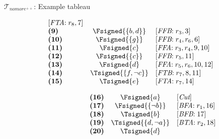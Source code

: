 \begin{frame}{$\mathcal{T}_{\textit{nomore}^{++}}$: Example tableau}
\begin{center}
\begin{minipage}[t]{16cm}
\begin{minipage}[t]{4.5cm}
\[\begin{array}{lcl}
  [\textit{FTA}{:}\;r_8, \text{7}]                 \\
\textbf{(9)}                                       &
  \Fsigned{\{b,d\}}                                &
  [\textit{FFB}{:}\;r_3, \text{3}]                 \\
\textbf{(10)}                                      &
  \Fsigned{\{g\}}                                  &
  [\textit{FFB}{:}\;r_4, r_6, \text{6}]            \\
\textbf{(11)}                                      &
  \Fsigned{c}                                      &
  [\textit{FFA}{:}\;r_3,r_4, \text{9}, \text{10}]  \\
\textbf{(12)}                                      &
  \Fsigned{\{c\}}                                  &
  [\textit{FFB}{:}\;r_5, \text{11}]                \\
\textbf{(13)}                                      &
  \Fsigned{d}                                      &
  [\textit{FFA}{:}\;r_5,r_6, \text{10}, \text{12}] \\
\textbf{(14)}                                      &
  \Tsigned{\{f,\neg c\}}                   &
  [\textit{FTB}{:}\;r_7, \text{8}, \text{11}]      \\
\textbf{(15)}                                      &
  \Tsigned{e}                                      &
  [\textit{FTA}{:}\;r_7, \text{14}]
\end{array}
\]
\end{minipage}
\begin{minipage}[t]{6cm}
\[
\hspace{2.2cm}
\begin{array}{lcl}
\textbf{(16)}                                      &
  \Fsigned{a}                                      &
  [\textit{Cut}]                                   \\
\textbf{(17)}                                      &
  \Fsigned{\{\neg b\}}                     &
  [\textit{BFA}{:}\; r_1, \text{16}]               \\
\textbf{(18)}                                      &
  \Tsigned{b}                                      &
  [\textit{BFB}{:}\; \text{17}]                    \\
\textbf{(19)}                                      &
  \Tsigned{\{d,\neg a\}}                   &
  [\textit{BTA}{:}\;r_2, \text{18}]                \\
\textbf{(20)}                                      &
  \Tsigned{d}                                      &

\end{array}\]
\end{minipage}
\end{minipage}
\end{center}
\end{frame}
